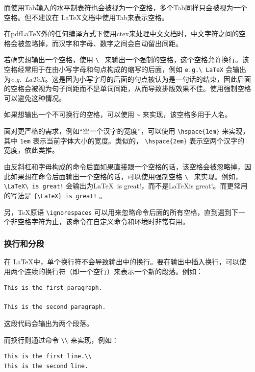 而使用Tab输入的水平制表符也会被视为一个空格，多个Tab同样只会被视为一个空格。但不建议在 \LaTeX 文档中使用Tab来表示空格。

在pdf\LaTeX 外的任何编译方式下使用ctex来处理中文文档时，中文字符之间的空格会被忽略掉，而汉字和字母、数字之间会自动留出间距。

若确实想输出一个空格，使用 \verb|\ | 来输出一个强制的空格，这个空格允许换行。该空格经常用于在由小写字母和句点构成的缩写的后面，例如 \verb|e.g.\ LaTeX| 会输出为\textit{e.g.\ \LaTeX}。这是因为小写字母的后面的句点被认为是一句话的结束，因此后面的空格会被视为句子间距而不是单词间距，从而导致排版效果不佳。使用强制空格可以避免这种情况。

如果想输出一个不可换行的空格，可以使用 \verb|~| 来实现，该空格多用于人名。

面对更严格的需求，例如“空一个汉字的宽度”，可以使用 \verb|\hspace{1em}| 来实现，其中 \verb|1em| 表示当前字体大小的宽度。类似的， \verb|\hspace{2em}| 表示空两个汉字的宽度，依此类推。

由反斜杠和字母构成的命令后面如果直接跟一个空格的话，该空格会被忽略掉，因此如果想在命令后面输出一个空格的话，可以使用强制空格 \verb|\ | 来实现。例如， \verb|\LaTeX\ is great!| 会输出为\LaTeX\ is great!，而不是\LaTeX is great!。而更常用的写法是 \verb|{\LaTeX} is great!| 。

另，\TeX 原语 \verb|\ignorespaces| 可以用来忽略命令后面的所有空格，直到遇到下一个非空格字符为止，该命令在自定义命令和环境时非常有用。

\subsubsection{换行和分段}

在 \LaTeX 中，单个换行符不会导致输出中的换行。要在输出中插入换行，可以使用两个连续的换行符（即一个空行）来表示一个新的段落。例如：
\begin{verbatim}
This is the first paragraph.

This is the second paragraph.
\end{verbatim}

这段代码会输出为两个段落。

而换行则通过命令 \verb|\\| 来实现，例如：
\begin{verbatim}
This is the first line.\\
This is the second line.
\end{verbatim}

